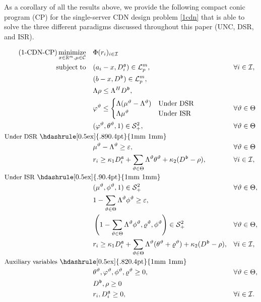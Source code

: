 \documentclass[a4paper,11pt,reqno]{amsart}
\DeclareMathOperator*{\minimize}{minimize}
\DeclareMathOperator{\st}{subject\; to}
\newcommand{\R}{\mathbb{R}}
\newcommand{\LL}{\mathcal{L}}
\renewcommand{\SS}{\mathcal{S}}
\newcommand{\I}{\mathcal{I}}
\begin{document}
As a corollary of all the results above, we provide the following compact conic program (CP) for the single-server CDN design problem \eqref{1cdn} that is able to solve the three different paradigms discussed throughout this paper (UNC, DSR, and ISR).

\begin{align*}\label{eq:1-cdn-cp}\tag{\rm 1-CDN-CP}
    \minimize_{x\in\R^m, \mu\in \mathcal{C}} \quad & \Phi(r_i)_{i\in\I} && \\
    \st \quad & (a_i - x, D^{\frak a}_i) \in \LL_p^{m}, &&  \forall i \in \I, \\
    & (b - x, D^{\frak b}) \in \LL_p^{m},&& \\
    & \Lambda\rho \leq \Lambda^H D^{\frak b}, &&\\
    & \varphi^\vartheta \leq \begin{cases}
        \Lambda(\mu^\vartheta- \Lambda^\vartheta) & \text{Under DSR}\\
        \Lambda\mu^\vartheta & \text{Under ISR}
    \end{cases} && \forall \vartheta\in \Theta\\
    &(\varphi^\vartheta,\theta^\vartheta, 1) \in \SS^2_+, && \forall \vartheta\in \Theta\\
    \noalign{
    \noindent {\small Under DSR} \hdashrule[0.5ex]{.89\linewidth}{0.4pt}{1mm 1mm}
    }
    & \mu^\vartheta-\Lambda^\vartheta \geq \varepsilon, && \forall \vartheta\in\Theta\\
    & r_i\geq \kappa_1 D^{\frak a}_i+ \sum_{\vartheta\in\Theta} \Lambda^\vartheta\theta^\vartheta + \kappa_2(D^{\frak b}- \rho), & & \forall i\in\I,\\
    \noalign{
    \noindent {\small Under ISR} \hdashrule[0.5ex]{.9\linewidth}{0.4pt}{1mm 1mm}
    }
    & (\mu^\vartheta, \phi^\vartheta,1)\in \SS^2_+ &&  \forall \vartheta\in\Theta,\\
    & 1-\sum_{\vartheta\in\Theta} \Lambda^\vartheta\phi^\vartheta \geq \varepsilon, &&\\
    & \left(1-\sum_{\vartheta\in\Theta} \Lambda^\vartheta\phi^\vartheta, \varrho^\vartheta, \phi^\vartheta\right)\in \SS^2_+&& \forall \vartheta\in\Theta,\\
   & r_i\geq \kappa_1 D^{\frak a}_i+ \sum_{\vartheta\in\Theta} \Lambda^\vartheta(\theta^\vartheta+\varrho^\vartheta) + \kappa_2(D^{\frak b}- \rho), &&  \forall i\in\I,\\
   \noalign{
    \noindent {\small Auxiliary variables} \hdashrule[0.5ex]{.82\linewidth}{0.4pt}{1mm 1mm}
    }
   & \theta^\vartheta, \varphi^\vartheta,\phi^\vartheta, \varrho^\vartheta\geq 0, && \forall \vartheta\in\Theta,\\
   & D^\frak{b},\rho \geq 0 && \\
   & r_i, D_{i}^\frak{a}\geq 0, && \forall i\in\I.
\end{align*}
\end{document}
